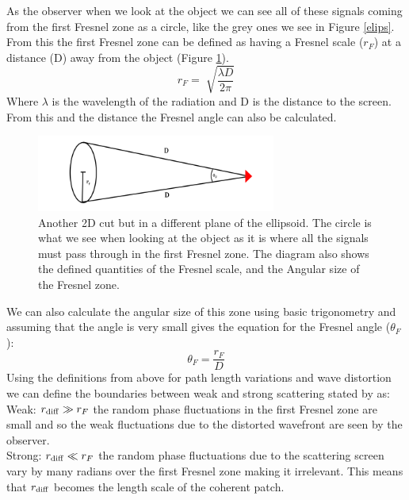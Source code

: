 \documentclass[a4paper, 10pt]{article}
\begin{document}
As the observer when we look at the object we can see all of these signals coming from the first Fresnel zone as a circle, like the grey ones we see in Figure \ref{elips}. From this the first Fresnel zone can be defined as having a Fresnel scale ($r_F$) at a distance (D) away from the object (Figure \ref{circle}). 
\begin{equation}
r_F=\sqrt[]{\dfrac{\lambda D}{2\pi}}
\label{eq:rf}
\end{equation}
Where $\lambda$ is the wavelength of the radiation and D is the distance to the screen. From this and the distance the Fresnel angle can also be calculated.
\begin{figure}[H]
\centering 
\includegraphics[width=0.7\textwidth]{Fres_circle}
\caption{Another 2D cut but in a different plane of the ellipsoid. The circle is what we see when looking at the object as it is where all the signals must pass through in the first Fresnel zone. The diagram also shows the defined quantities of the Fresnel scale, and the Angular size of the Fresnel zone.}
\label{circle}
\end{figure}
We can also calculate the angular size of this zone using basic trigonometry and assuming that the angle is very small gives the equation for the Fresnel angle ($\theta_F$):
\begin{equation}
    \theta_F=\dfrac{r_F}{D}
    \label{eq:thetaf}
\end{equation}
Using the definitions from above for path length variations and wave distortion we can define the boundaries between weak and strong scattering stated by \citet{Narayan} as:\\

Weak: $r_{\ce{diff}} \gg r_{F}$ the random phase fluctuations in the first Fresnel zone are small and so the weak fluctuations due to the distorted wavefront are seen by the observer.\\

Strong: $r_{\ce{diff}} \ll r_{F}$ the random phase fluctuations due to the scattering screen vary by many radians over the first Fresnel zone making it irrelevant. This means that $r_{\ce{diff}}$ becomes the length scale of the coherent patch.\\
\end{document}
